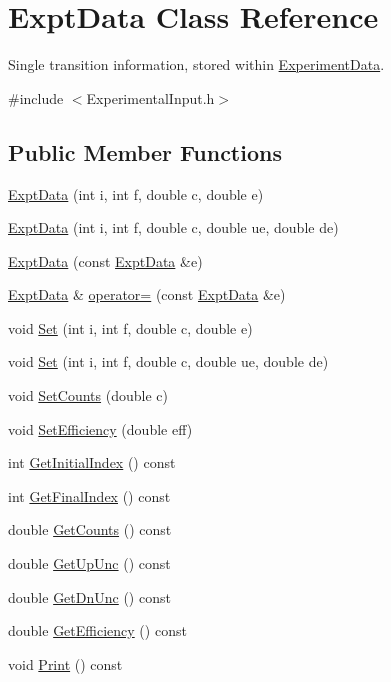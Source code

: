 \hypertarget{classExptData}{\section{Expt\-Data Class Reference}
\label{classExptData}
}


Single transition information, stored within \hyperlink{classExperimentData}{Experiment\-Data}.  




{\ttfamily \#include $<$Experimental\-Input.\-h$>$}

\subsection*{Public Member Functions}
\begin{DoxyCompactItemize}
\item 
\hyperlink{classExptData_a45516a1c812eb98a2c9161822fdb5bdc}{Expt\-Data} (int i, int f, double c, double e)
\item 
\hyperlink{classExptData_abe44c3dd192ecaed02dcbe9c251c30f1}{Expt\-Data} (int i, int f, double c, double ue, double de)
\item 
\hyperlink{classExptData_a030026d0796125e06287555160752abe}{Expt\-Data} (const \hyperlink{classExptData}{Expt\-Data} \&e)
\item 
\hyperlink{classExptData}{Expt\-Data} \& \hyperlink{classExptData_abaec133873ceee3e02d77951451bcdc6}{operator=} (const \hyperlink{classExptData}{Expt\-Data} \&e)
\item 
void \hyperlink{classExptData_a9f1982e8e8471bf8b99017d60e0bdd02}{Set} (int i, int f, double c, double e)
\item 
void \hyperlink{classExptData_aabe3d956a3235307f474ab08b78c1fcb}{Set} (int i, int f, double c, double ue, double de)
\item 
void \hyperlink{classExptData_ad624ee2122e68682cc169837c1ca8982}{Set\-Counts} (double c)
\item 
void \hyperlink{classExptData_afff049b9a06c22761797834200954d90}{Set\-Efficiency} (double eff)
\item 
int \hyperlink{classExptData_a706e630776c6a7631bf9262ad1a80106}{Get\-Initial\-Index} () const 
\item 
int \hyperlink{classExptData_a0c78fa191eb42a996b54b626bc1cbfaf}{Get\-Final\-Index} () const 
\item 
double \hyperlink{classExptData_af1cb66118a2f20e87cc83168417ff5db}{Get\-Counts} () const 
\item 
double \hyperlink{classExptData_a8439a7e32034c37e59634166a107d324}{Get\-Up\-Unc} () const 
\item 
double \hyperlink{classExptData_a127c06dc6111a694bbe07bd7de9f9dd8}{Get\-Dn\-Unc} () const 
\item 
double \hyperlink{classExptData_ae7fd92485ef49fdb4fcd0966163ce397}{Get\-Efficiency} () const 
\item 
void \hyperlink{classExptData_a68d25d343b572b676a14fb3d79b211ae}{Print} () const 
\end{DoxyCompactItemize}


